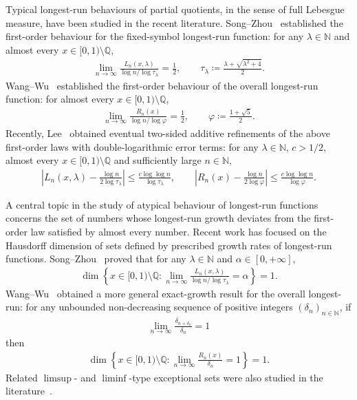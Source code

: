 \documentclass[12pt,reqno]{amsart}
\theoremstyle{definition}
\theoremstyle{plain}
\begin{document}
Typical longest-run behaviours of partial quotients, in the sense of full Lebesgue measure, have been studied in the recent literature. Song--Zhou~\cite[Theorem~1.1]{SongZhou2020} established the first-order behaviour for the fixed-symbol longest-run function: for any $\lambda\in\mathbb{N}$ and almost every $x\in[0,1)\setminus\mathbb{Q}$,
\begin{align*}
    \lim_{n\to\infty}\frac{L_n(x,\lambda)}{\log{n}/\log{\tau_\lambda}}
    =\frac12,
    \qquad
    \tau_\lambda\coloneqq \frac{\lambda+\sqrt{\lambda^2+4}}{2}.
\end{align*}
Wang--Wu~\cite[Theorem~1.3]{WangWu2011} established the first-order behaviour of the overall longest-run function: for almost every $x\in[0,1)\setminus\mathbb{Q}$,
\begin{align*}
    \lim_{n\to\infty}\frac{R_n(x)}{\log{n}/\log{\varphi}}
    =\frac12,
    \qquad
    \varphi\coloneqq\frac{1+\sqrt5}{2}.
\end{align*}
Recently, Lee~\cite[Theorem~2]{Lee2026} obtained eventual two-sided additive refinements of the above first-order laws with double-logarithmic error terms: for any $\lambda\in\mathbb{N}$, $c>1/2$, almost every $x\in[0,1)\setminus\mathbb{Q}$ and sufficiently large $n\in\mathbb{N}$,
\begin{align*}
    \left|L_n(x,\lambda)-\frac{\log{n}}{2\log{\tau_\lambda}}\right|
    \leq \frac{c\log{\log{n}}}{\log{\tau_\lambda}},
    \qquad
    \left|R_n(x)-\frac{\log{n}}{2\log{\varphi}}\right|
    \leq \frac{c\log{\log{n}}}{\log{\varphi}}.
\end{align*}

A central topic in the study of atypical behaviour of longest-run functions concerns the set of numbers whose longest-run growth deviates from the first-order law satisfied by almost every number. Recent work has focused on the Hausdorff dimension of sets defined by prescribed growth rates of longest-run functions. Song--Zhou~\cite[Corollary~1.3]{SongZhou2020} proved that for any $\lambda\in\mathbb{N}$ and $\alpha\in[0,+\infty]$,
\begin{align*}
    \dim{
    \left\{x\in[0,1)\setminus\mathbb{Q}:
    \lim_{n\to\infty}\frac{L_n(x,\lambda)}{\log{n}/\log{\tau_\lambda}}=\alpha\right\}}=1.
\end{align*}
Wang--Wu~\cite[Theorem~1.3]{WangWu2011} obtained a more general exact-growth result for the overall longest-run: for any unbounded non-decreasing sequence of positive integers $(\delta_n)_{n\in\mathbb{N}}$, if
\begin{align*}
    \lim_{n\to\infty}\frac{\delta_{n+\delta_n}}{\delta_n}=1
\end{align*}
then 
\begin{align*}
    \dim{
    \left\{x\in[0,1)\setminus\mathbb{Q}:
    \lim_{n\to\infty}\frac{R_n(x)}{\delta_n}=1\right\}}=1.
\end{align*}
Related $\limsup$- and $\liminf$-type exceptional sets were also studied in the literature~\cite{SongZhou2020,TanZhou2025,WangWu2011}.
\end{document}
